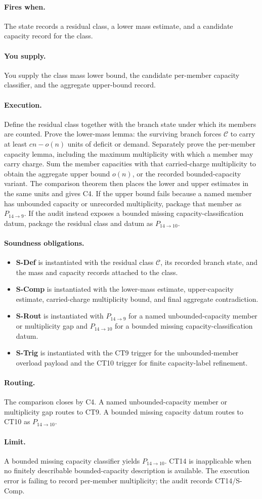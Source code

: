 \documentclass[
  11pt,
]{article}
\providecommand{\tightlist}{%
  \setlength{\itemsep}{0pt}\setlength{\parskip}{0pt}}
\theoremstyle{definition}
\newcommand{\ctpar}[1]{\paragraph{#1.}}
\begin{document}
\ctpar{Fires when}
The state records a residual class, a lower mass estimate, and a
candidate capacity record for the class.

\ctpar{You supply}
You supply the class mass lower bound, the candidate per-member capacity
classifier, and the aggregate upper-bound record.

\ctpar{Execution}
Define the residual class together with the branch state under which its
members are counted.  Prove the lower-mass lemma: the surviving branch
forces \(\mathcal C\) to carry at least \(cn-o(n)\) units of deficit or
demand.  Separately prove the per-member capacity lemma, including the
maximum multiplicity with which a member may carry charge.  Sum the
member capacities with that carried-charge multiplicity to obtain the
aggregate upper bound \(o(n)\), or the recorded bounded-capacity variant.
The comparison theorem then places the lower and upper estimates in the
same units and gives C4.  If the upper bound fails because a named
member has unbounded capacity or unrecorded multiplicity, package that
member as \(P_{14\to9}\).  If the audit instead exposes a bounded missing
capacity-classification datum, package the residual class and datum as
\(P_{14\to10}\).

\ctpar{Soundness obligations}
\begin{itemize}
\tightlist
\item \textbf{S-Def} is instantiated with the residual class \(\mathcal C\), its recorded branch state, and the mass and capacity records attached to the class.
\item \textbf{S-Comp} is instantiated with the lower-mass estimate, upper-capacity estimate, carried-charge multiplicity bound, and final aggregate contradiction.
\item \textbf{S-Rout} is instantiated with \(P_{14\to9}\) for a named unbounded-capacity member or multiplicity gap and \(P_{14\to10}\) for a bounded missing capacity-classification datum.
\item \textbf{S-Trig} is instantiated with the CT9 trigger for the unbounded-member overload payload and the CT10 trigger for finite capacity-label refinement.
\end{itemize}

\ctpar{Routing}
The comparison closes by C4.  A named unbounded-capacity member or
multiplicity gap routes to CT9.  A bounded missing capacity datum routes
to CT10 as \(P_{14\to10}\).

\ctpar{Limit}
A bounded missing capacity classifier yields \(P_{14\to10}\). CT14 is
inapplicable when no finitely describable bounded-capacity description is
available. The execution error is failing to record per-member
multiplicity; the audit records CT14/S-Comp.
\end{document}
